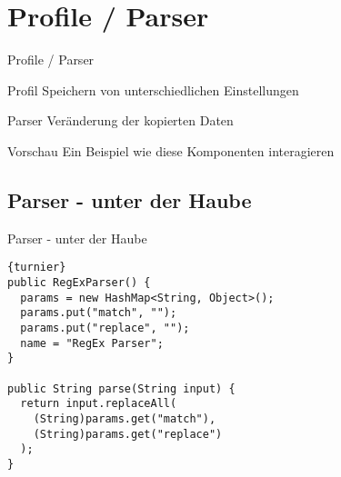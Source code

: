 \section{Profile / Parser}
\begin{frame}{Profile / Parser}
	\begin{block}{Profil}
		Speichern von unterschiedlichen Einstellungen
	\end{block}
	\begin{block}{Parser}
		Veränderung der kopierten Daten
	\end{block}
	\begin{block}{Vorschau}
		Ein Beispiel wie diese Komponenten interagieren
	\end{block}
\end{frame}

\subsection{Parser - unter der Haube}
\begin{frame}[fragile]{Parser - unter der Haube}
\begin{lstlisting}[caption=RegExParser.java]{turnier}
public RegExParser() {
  params = new HashMap<String, Object>();
  params.put("match", "");
  params.put("replace", "");
  name = "RegEx Parser";
}

public String parse(String input) {
  return input.replaceAll(
    (String)params.get("match"), 
    (String)params.get("replace")
  );
}
\end{lstlisting}
\end{frame}
